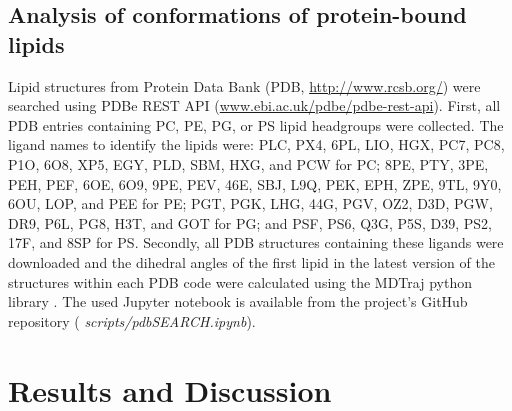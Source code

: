 \documentclass[aps,prl,superscriptaddress,twocolumn]{revtex4}
\begin{document}
\subsection{Analysis of conformations of protein-bound lipids}
Lipid structures from Protein Data Bank (PDB, \url{http://www.rcsb.org/})
were searched using PDBe REST API (\url{www.ebi.ac.uk/pdbe/pdbe-rest-api}).
First, all PDB entries containing PC, PE, PG, or PS lipid headgroups were collected.
The ligand names to identify the lipids were:
PLC, PX4, 6PL, LIO, HGX, PC7, PC8, P1O, 6O8, XP5, EGY, PLD, SBM, HXG, and PCW for PC;
8PE, PTY, 3PE, PEH, PEF, 6OE, 6O9, 9PE, PEV, 46E, SBJ, L9Q, PEK, EPH, ZPE, 9TL, 9Y0, 6OU, LOP, and PEE for PE;
PGT, PGK, LHG, 44G, PGV, OZ2, D3D, PGW, DR9, P6L, PG8, H3T, and GOT for PG; and
PSF, PS6, Q3G, P5S, D39, PS2, 17F, and 8SP for PS.
Secondly, all PDB structures containing these ligands were downloaded and the dihedral angles of the first lipid in the latest version of the structures within each PDB code were calculated using the MDTraj python library \cite{mcgibbon15}.
The used Jupyter notebook is available from the project's GitHub repository (\textit{ scripts/pdbSEARCH.ipynb}).



\section{Results and Discussion}
\end{document}
